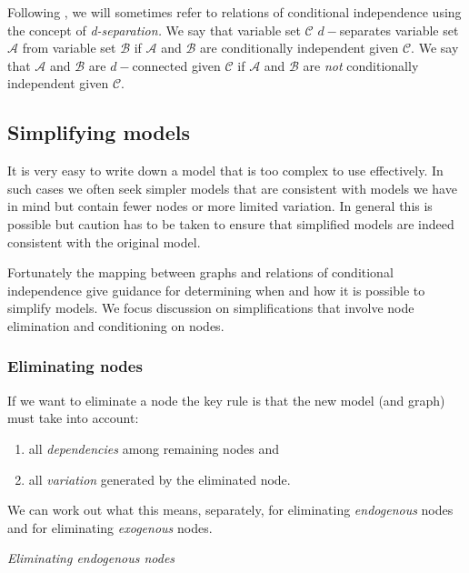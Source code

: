 \documentclass[
  12pt,
]{book}
\providecommand{\tightlist}{%
  \setlength{\itemsep}{0pt}\setlength{\parskip}{0pt}}
\begin{document}
Following \citet{pearl2000causality}, we will sometimes refer to relations of conditional independence using the concept of \emph{d-separation.} We say that variable set \(\mathcal C\) \(d-\)separates variable set \(\mathcal A\) from variable set \(\mathcal B\) if \(\mathcal A\) and \(\mathcal B\) are conditionally independent given \(\mathcal C\). We say that \(\mathcal A\) and \(\mathcal B\) are \(d-\)connected given \(\mathcal C\) if \(\mathcal A\) and \(\mathcal B\) are \emph{not} conditionally independent given \(\mathcal C\).

\hypertarget{simplifying-models}{%
\subsection{Simplifying models}\label{simplifying-models}}

It is very easy to write down a model that is too complex to use effectively. In such cases we often seek simpler models that are consistent with models we have in mind but contain fewer nodes or more limited variation. In general this is possible but caution has to be taken to ensure that simplified models are indeed consistent with the original model.

Fortunately the mapping between graphs and relations of conditional independence give guidance for determining when and how it is possible to simplify models. We focus discussion on simplifications that involve node elimination and conditioning on nodes.

\hypertarget{eliminating-nodes}{%
\subsubsection{Eliminating nodes}\label{eliminating-nodes}}

If we want to eliminate a node the key rule is that the new model (and graph) must take into account:

\begin{enumerate}
\def\labelenumi{(\alph{enumi})}
\tightlist
\item
  all \emph{dependencies} among remaining nodes and
\item
  all \emph{variation} generated by the eliminated node.
\end{enumerate}

We can work out what this means, separately, for eliminating \emph{endogenous} nodes and for eliminating \emph{exogenous} nodes.

\emph{Eliminating endogenous nodes}
\end{document}
